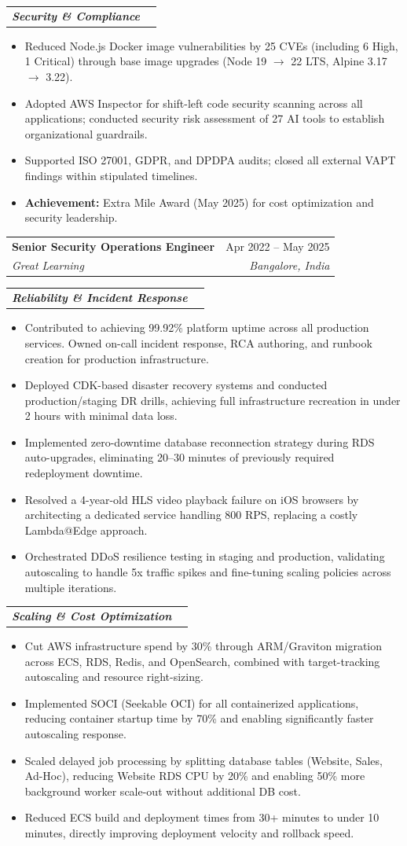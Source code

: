 \documentclass[letterpaper,11pt]{article}
\makeatletter
\newcommand{\resumeItem}[1]{\item\small{#1 \vspace{-2pt}}}
\newcommand{\resumeSubheading}[4]{
  \vspace{-2pt}\item
    \begin{tabular*}{0.97\textwidth}[t]{l@{\extracolsep{\fill}}r}
      \textbf{#1} & #2 \\
      \textit{\small#3} & \textit{\small #4} \\
    \end{tabular*}\vspace{-7pt}
}
\newcommand{\resumeSubheadingContinue}[2]{
  \vspace{2pt}
  \begin{tabular*}{0.97\textwidth}[t]{l@{\extracolsep{\fill}}r}
    \textit{\small\textbf{#1}} \\
  \end{tabular*}\vspace{-7pt}
}
\newcommand{\resumeItemListStart}{\begin{itemize}}
\newcommand{\resumeItemListEnd}{\end{itemize}\vspace{-5pt}}
\makeatother
\begin{document}
    \resumeSubheadingContinue{Security \& Compliance}{}
    \resumeItemListStart
        \resumeItem{Reduced Node.js Docker image vulnerabilities by 25 CVEs (including 6 High, 1 Critical) through base image upgrades (Node 19 $\rightarrow$ 22 LTS, Alpine 3.17 $\rightarrow$ 3.22).}
        \resumeItem{Adopted AWS Inspector for shift-left code security scanning across all applications; conducted security risk assessment of 27 AI tools to establish organizational guardrails.}
        \resumeItem{Supported ISO 27001, GDPR, and DPDPA audits; closed all external VAPT findings within stipulated timelines.}
        \resumeItem{\textbf{Achievement:} Extra Mile Award (May 2025) for cost optimization and security leadership.}
    \resumeItemListEnd

    \resumeSubheading
      {Senior Security Operations Engineer}{Apr 2022 -- May 2025}
      {Great Learning}{Bangalore, India}

    \resumeSubheadingContinue{Reliability \& Incident Response}{}
    \resumeItemListStart
        \resumeItem{Contributed to achieving 99.92\% platform uptime across all production services. Owned on-call incident response, RCA authoring, and runbook creation for production infrastructure.}
        \resumeItem{Deployed CDK-based disaster recovery systems and conducted production/staging DR drills, achieving full infrastructure recreation in under 2 hours with minimal data loss.}
        \resumeItem{Implemented zero-downtime database reconnection strategy during RDS auto-upgrades, eliminating 20--30 minutes of previously required redeployment downtime.}
        \resumeItem{Resolved a 4-year-old HLS video playback failure on iOS browsers by architecting a dedicated service handling 800 RPS, replacing a costly Lambda@Edge approach.}
        \resumeItem{Orchestrated DDoS resilience testing in staging and production, validating autoscaling to handle 5x traffic spikes and fine-tuning scaling policies across multiple iterations.}
    \resumeItemListEnd

    \resumeSubheadingContinue{Scaling \& Cost Optimization}{}
    \resumeItemListStart
        \resumeItem{Cut AWS infrastructure spend by 30\% through ARM/Graviton migration across ECS, RDS, Redis, and OpenSearch, combined with target-tracking autoscaling and resource right-sizing.}
        \resumeItem{Implemented SOCI (Seekable OCI) for all containerized applications, reducing container startup time by 70\% and enabling significantly faster autoscaling response.}
        \resumeItem{Scaled delayed job processing by splitting database tables (Website, Sales, Ad-Hoc), reducing Website RDS CPU by 20\% and enabling 50\% more background worker scale-out without additional DB cost.}
        \resumeItem{Reduced ECS build and deployment times from 30+ minutes to under 10 minutes, directly improving deployment velocity and rollback speed.}
    \resumeItemListEnd
\end{document}
